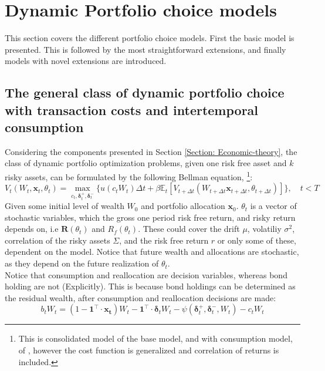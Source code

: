 \documentclass[11pt]{article}
\begin{document}
\fi

\section{Dynamic Portfolio choice models} \label{Section: Portfolio-choice-models}
This section covers the different portfolio choice models.
First the basic model is presented. This is followed by the most straightforward extensions,
and finally models with novel extensions are introduced.

\subsection{The general class of dynamic portfolio choice with transaction costs and intertemporal consumption} \label{Subsection: Dynamic-portfolio-choice} 
Considering the components presented in Section \ref{Section: Economic-theory},
the class of dynamic portfolio optimization problems, given one risk free asset and $k$ risky assets, can be formulated 
by the following Bellman equation, \textcite{Bellman1958}\footnote{This is consolidated model of the base model, and with consumption model, of \textcite{CaiJuddXu2020},
however the cost function is generalized and correlation of returns is included.}:
\begin{equation} \label{eq: class_bellman_non_normalized}
  V_{t} (W_t , \mathbf{x}_{t}, \theta_t) = \max_{c_t , \boldsymbol{\delta}^{+}_{t}, \boldsymbol{\delta}^{-}_{t}  } \{ u(c_t W_t ) 
  \Delta t + \beta \mathbb{E}_{t} \left[ 
    V_{t+\Delta t} (W_{t+\Delta t } \mathbf{x}_{t+\Delta t }, \theta_{t + \Delta t }  ) 
    \right] \}, \quad t < T 
\end{equation}
Given some initial level of wealth $W_0$ and portfolio allocation $\mathbf{x}_0$. \( \theta_t \) is a vector of stochastic variables, which
the gross one period risk free return, and risky return depends on, i.e \( \mathbf{R}(\theta_t) \) and \( R_f (\theta_t) \).
These could cover the drift $\mu $, volatiliy $\sigma^{2}$, correlation of the risky assets $\Sigma$, and the risk free return $r$ or only some of these, dependent on the model.
Notice that future wealth and allocations are stochastic, as they depend on the future realization of $\theta_t$.\\
Notice that consumption and reallocation are decision variables, whereas bond holding are not (Explicitly).
This is because bond holdings can be determined as the residual wealth, after consumption and reallocation decisions are made:
\begin{equation}\label{eq: class_bond_holdings_non_normalized}
  b_{t} W_t = \left( 1 - \mathbf{1}^{\top} \cdot \mathbf{x_t}  \right) W_t - \mathbf{1}^{\top} \cdot \boldsymbol{\delta}_t W_t 
  - \psi (\boldsymbol{\delta}^{+}_{t}, \boldsymbol{\delta}^{-}_t , W_t)
  - c_t W_t
\end{equation}
\end{document}
